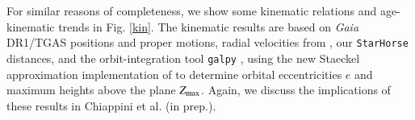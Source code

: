 \documentclass{aa}  %
\begin{document}

For similar reasons of completeness, we show some kinematic relations and age-kinematic trends in Fig. \ref{kin}. The kinematic results are based on {\it Gaia} DR1/TGAS positions and proper motions, radial velocities from \citet{Adibekyan2012}, our {\tt StarHorse} distances, and the orbit-integration tool {\tt galpy} \citep{Bovy2015}, using the new Staeckel approximation implementation of \citet{Mackereth2018} to determine orbital eccentricities $e$ and maximum heights above the plane $Z_{\rm max}$. Again, we discuss the implications of these results in Chiappini et al. (in prep.).

% 
% 
% 
\end{document}
